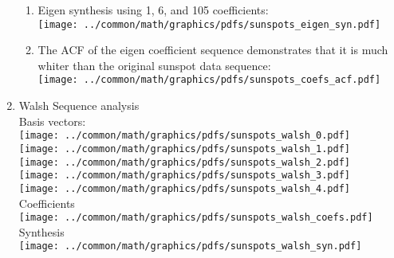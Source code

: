 \begin{example}
\begin{enumerate}
\begin{enumerate}
\item Eigen synthesis using 1, 6, and 105 coefficients:
\\\texttt{[image: ../common/math/graphics/pdfs/sunspots\_eigen\_syn.pdf]}

\item The ACF of the eigen coefficient sequence demonstrates that
      it is much whiter than the original sunspot data sequence:
\\\texttt{[image: ../common/math/graphics/pdfs/sunspots\_coefs\_acf.pdf]}

\end{enumerate}

\item Walsh Sequence analysis
\\Basis vectors:
\\\texttt{[image: ../common/math/graphics/pdfs/sunspots\_walsh\_0.pdf]}
\\\texttt{[image: ../common/math/graphics/pdfs/sunspots\_walsh\_1.pdf]}
\\\texttt{[image: ../common/math/graphics/pdfs/sunspots\_walsh\_2.pdf]}
\\\texttt{[image: ../common/math/graphics/pdfs/sunspots\_walsh\_3.pdf]}
\\\texttt{[image: ../common/math/graphics/pdfs/sunspots\_walsh\_4.pdf]}
\\Coefficients
\\\texttt{[image: ../common/math/graphics/pdfs/sunspots\_walsh\_coefs.pdf]}
\\Synthesis
\\\texttt{[image: ../common/math/graphics/pdfs/sunspots\_walsh\_syn.pdf]}
\end{enumerate}
\end{example}

